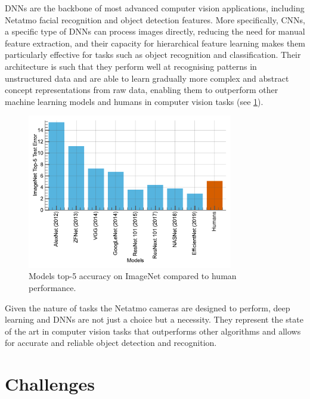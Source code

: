 \acp{DNN} are the backbone of most advanced computer vision applications,
including Netatmo facial recognition and object detection features. More
specifically, \acp{CNN}, a specific type of \acp{DNN} can process images
directly, reducing the need for manual feature extraction, and their capacity
for hierarchical feature learning makes them particularly effective for tasks
such as object recognition and classification. Their architecture is such that
they perform well at recognising patterns in unstructured data and are able to
learn gradually more complex and abstract concept representations from raw data,
enabling them to outperform other machine learning models and humans in computer
vision tasks (see \cref{fig:intro:models_vs_humans}).\\

\begin{figure}[htbp]
      \centering
      \includegraphics[width=0.8\textwidth]{chapter_intro/assets/models_vs_human.pdf}
      \caption{Models top-5 accuracy on ImageNet \cite{deng2009imagenet} compared
            to human performance.}
      \label{fig:intro:models_vs_humans}
\end{figure}

Given the nature of tasks the Netatmo cameras are designed to perform, deep
learning and \aclp{DNN} are not just a choice but a necessity. They represent
the state of the art in computer vision tasks that outperforms other algorithms
and allows for accurate and reliable object detection and recognition.\\

\section{Challenges}

